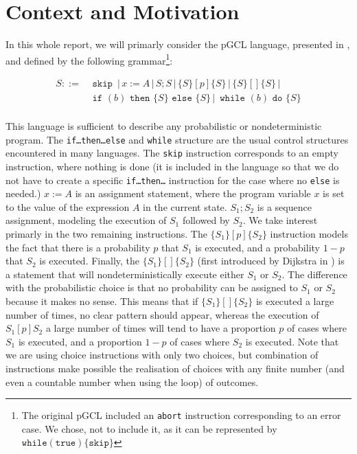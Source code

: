 \documentclass[a4paper,10pt]{llncs}
\newcommand\temp[1]{{\color{temp} #1}}
\begin{document}
\section{Context and Motivation}
\label{sec:context}
\temp{
In this whole report, we will primarly consider the pGCL language, presented in \cite{McIver05}, and defined by the following grammar\footnote{The original pGCL included an \texttt{abort} instruction corresponding to an error case. We chose, not to include it, as it can be represented by $\texttt{while} (\texttt{true})\{ \texttt{skip} \}$}:


\begin{align*}
 S ::= & \texttt{ skip } \,|\, x := A \,|\, S;S \,|\, \{S\} [p] \{S\} \,|\, \{S\} [\!] \{S\} \,|\ \\
 & \texttt{ if } (b) \texttt{ then } \{ S \} \texttt{ else } \{ S \} \,|\, \texttt{ while }(b) \texttt{ do }\{S\} \\
\end{align*}

This language is sufficient to describe any probabilistic or nondeterministic program. The \texttt{if\dots then\dots else} and \texttt{while} structure are the usual control structures encountered in many languages. The \texttt{skip} instruction corresponds to an empty instruction, where nothing is done (it is included in the language so that we do not have to create a specific \texttt{if\dots then\dots} instruction for the case where no \texttt{else} is needed.) $x := A$ is an assignment statement, where the program variable $x$ is set to the value of the expression $A$ in the current state. $S_1 ; S_2$ is a sequence assignment, modeling the execution of $S_1$ followed by $S_2$. We take interest primarly in the two remaining instructions.\newline
The $\{S_1\} [p] \{S_2\}$ instruction models the fact that there is a probability $p$ that $S_1$ is executed, and a probability $1-p$ that $S_2$ is executed. Finally, the $\{S_1\} [\!] \{S_2\} $ (first introduced by Dijkstra in \cite{Dijkstra76}) is a statement that will nondeterministically execute either $S_1$ or $S_2$. The difference with the probabilistic choice is that no probability can be assigned to $S_1$ or $S_2$ because it makes no sense. This means that if $\{S_1\} [\!] \{S_2\} $ is executed a large number of times, no clear pattern should appear, whereas the execution of $S_1 [p] S_2$ a large number of times will tend to have a proportion $p$ of cases where $S_1$ is executed, and a proportion $1-p$ of cases where $S_2$ is executed.\newline
Note that we are using choice instructions with only two choices, but combination of instructions make possible the realisation of choices with any finite number (and even a countable number when using the loop) of outcomes.\bigskip

}
\end{document}
